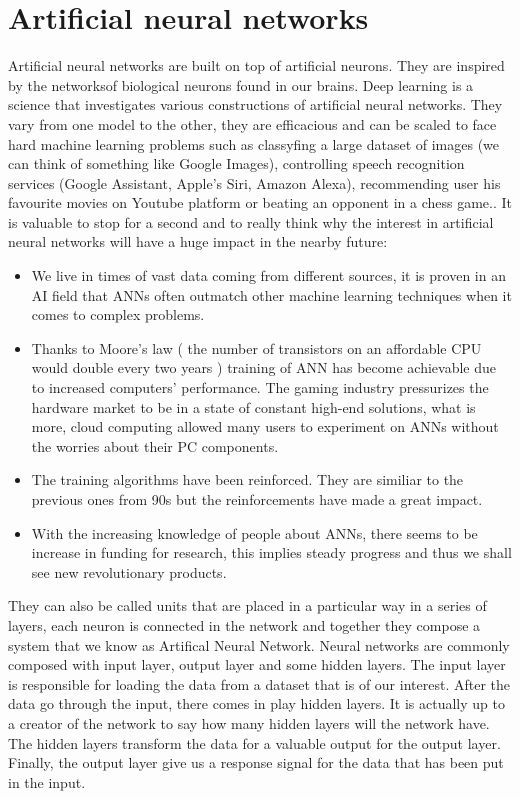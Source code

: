 \documentclass[a4paper,oneside,openright,11pt]{book}
\begin{document}
\section{Artificial neural networks}

Artificial neural networks are built on top of artificial neurons. They are inspired by the networksof biological neurons found in our brains. Deep learning is a science that investigates various constructions of
artificial neural networks. They vary from one model to the other, they are efficacious and can be scaled to face hard machine learning problems such as classyfing a large dataset of images (we can think of something like Google Images), controlling speech recognition services (Google Assistant, Apple's Siri, Amazon Alexa), recommending user his favourite movies on Youtube platform or beating an opponent in a chess game.\cite{aurelion}\cite{DeepLearningChess}. It is valuable to stop for a second and to really think why the interest in artificial neural networks will have a huge impact in the nearby future: 
 
\begin{itemize}
    \item We live in times of vast data coming from different sources, it is proven in an AI field that ANNs often outmatch other machine learning techniques when it comes to complex problems.
    \item Thanks to Moore's law ( the number of transistors on an affordable CPU would double every two years \cite{intel}) training of ANN has become achievable due to increased computers' performance. The gaming industry pressurizes the hardware market to be in a state of constant high-end solutions, what is more, cloud computing allowed many users to experiment on ANNs without the worries about their PC components.
    \item The training algorithms have been reinforced. They are similiar to the previous ones from 90s but the reinforcements have made a great impact.
    \item With the increasing knowledge of people about ANNs, there seems to be increase in funding for research, this implies steady progress and thus we shall see new revolutionary products.
\end{itemize}




They can also be called units that are placed in a particular way in a series of layers, each neuron is connected in the network and together they compose a system that we know as Artifical Neural Network. Neural networks are commonly composed with input layer, output layer and some hidden layers. The input layer is responsible for loading the data from a dataset that is of our interest. After the data go through the input, there comes in play hidden layers. It is actually up to a creator of the network to say how many hidden layers will the network have. The hidden layers transform the data for a valuable output for the output layer. Finally, the output layer give us a response signal for the data that has been put in the input. 
\end{document}
